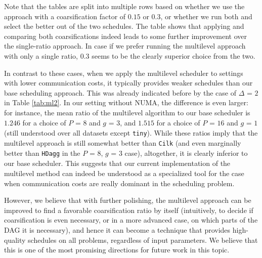 \documentclass[sigconf,nonacm]{acmart}
\begin{document}
Note that the tables are split into multiple rows based on whether we use the approach with a coarsification factor of $0.15$ or $0.3$, or whether we run both and select the better out of the two schedules. The table shows that applying and comparing both coarsifications indeed leads to some further improvement over the single-ratio approach. In case if we prefer running the multilevel approach with only a single ratio, $0.3$ seems to be the clearly superior choice from the two.

In contrast to these cases, when we apply the multilevel scheduler to settings with lower communication costs, it typically provides weaker schedules than our base scheduling approach. This was already indicated before by the case of $\Delta_{\!}=_{\!}2$ in Table \ref{tab:ml2}. In our setting without NUMA, the difference is even larger: for instance, the mean ratio of the multilevel algorithm to our base scheduler is $1.246$ for a choice of $P_{\!}=_{\!}8$ and $g_{\!}=_{\!}3$, and $1.515$ for a choice of $P_{\!}=_{\!}16$ and $g_{\!}=_{\!}1$ (still understood over all datasets except \texttt{tiny}). While these ratios imply that the multilevel approach is still somewhat better than \texttt{Cilk} (and even marginally better than \texttt{HDagg} in the $P_{\!}=_{\!}8$, $g_{\!}=_{\!}3$ case), altogether, it is clearly inferior to our base scheduler. This suggests that our current implementation of the multilevel method can indeed be understood as a specialized tool for the case when communication costs are really dominant in the scheduling problem.

However, we believe that with further polishing, the multilevel approach can be improved to find a favorable coarsification ratio by itself (intuitively, to decide if coarsification is even necessary, or in a more advanced case, on which parts of the DAG it is necessary), and hence it can become a technique that provides high-quality schedules on all problems, regardless of input parameters. We believe that this is one of the most promising directions for future work in this topic.
\end{document}

